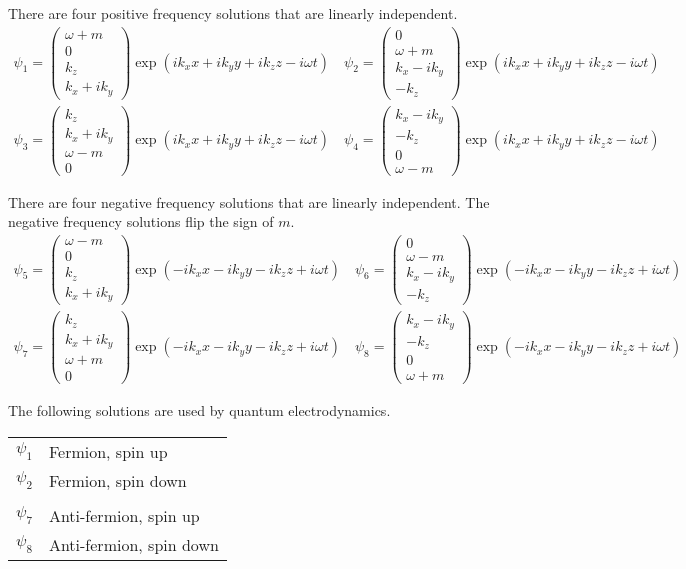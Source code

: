 \documentclass[12pt]{article}
\begin{document}
\noindent
There are four positive frequency solutions that are linearly independent.
{\small
\begin{gather*}
\psi_1=\begin{pmatrix}\omega+m\\0\\k_z\\k_x+ik_y\end{pmatrix}
\exp(ik_xx+ik_yy+ik_zz-i\omega t)
\quad
\psi_2=\begin{pmatrix}0\\ \omega+m\\k_x-ik_y\\-k_z\end{pmatrix}
\exp(ik_xx+ik_yy+ik_zz-i\omega t)
\\
\psi_3=\begin{pmatrix}k_z\\k_x+ik_y\\ \omega-m\\0\end{pmatrix}
\exp(ik_xx+ik_yy+ik_zz-i\omega t)
\quad
\psi_4=\begin{pmatrix}k_x-ik_y\\-k_z\\0\\ \omega-m\end{pmatrix}
\exp(ik_xx+ik_yy+ik_zz-i\omega t)
\end{gather*}
}

\noindent
There are four negative frequency solutions that are linearly independent.
The negative frequency solutions flip the sign of $m$.
{\small
\begin{gather*}
\psi_5=\begin{pmatrix}\omega-m\\0\\k_z\\k_x+ik_y\end{pmatrix}
\exp(-ik_xx-ik_yy-ik_zz+i\omega t)
\quad
\psi_6=\begin{pmatrix}0\\ \omega-m\\k_x-ik_y\\-k_z\end{pmatrix}
\exp(-ik_xx-ik_yy-ik_zz+i\omega t)
\\
\psi_7=\begin{pmatrix}k_z\\k_x+ik_y\\ \omega+m\\0\end{pmatrix}
\exp(-ik_xx-ik_yy-ik_zz+i\omega t)
\quad
\psi_8=\begin{pmatrix}k_x-ik_y\\-k_z\\0\\ \omega+m\end{pmatrix}
\exp(-ik_xx-ik_yy-ik_zz+i\omega t)
\end{gather*}
}

\noindent
The following solutions are used by quantum electrodynamics.
\begin{center}
\begin{tabular}{ll}
$\psi_1$ & Fermion, spin up\\
$\psi_2$ & Fermion, spin down\\
\\
$\psi_7$ & Anti-fermion, spin up\\
$\psi_8$ & Anti-fermion, spin down
\end{tabular}
\end{center}
\end{document}
